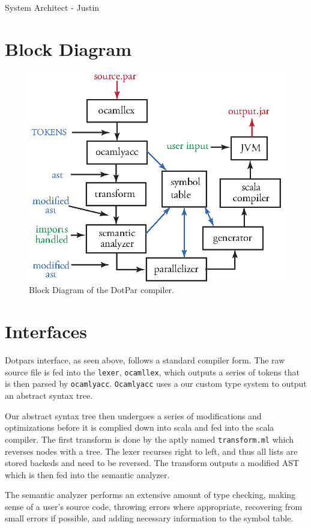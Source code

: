 System Architect - Justin
\section{Block Diagram}
\begin{figure}[H]
\centering
\includegraphics[scale=1]{blockdiagram.eps} 
\caption{Block Diagram of the DotPar compiler.}
\end{figure}

\section{Interfaces}
Dotpars interface, as seen above, follows a standard compiler form. The raw
source file is fed into the \verb=lexer=, \verb=ocamllex=, which outputs a series of tokens that is then
parsed by \verb=ocamlyacc=.  \verb=Ocamlyacc= uses a our custom type system to output an abstract
syntax tree.

Our abstract syntax tree then undergoes a series of modifications and optimizations before it
is complied down into scala and fed into the scala compiler.  The first transform
is done by the aptly named \verb=transform.ml= which reverses nodes with a tree.  The lexer
recurses right to left, and thus all lists are stored backeds and need to be reversed.
The transform outputs a modified AST which is then fed into the semantic analyzer.

The semantic analyzer performs an extensive amount of type checking, making 
sense of a user's source code, throwing errors where appropriate, recovering from 
small errors if possible,  and adding necessary information to the symbol table.  

